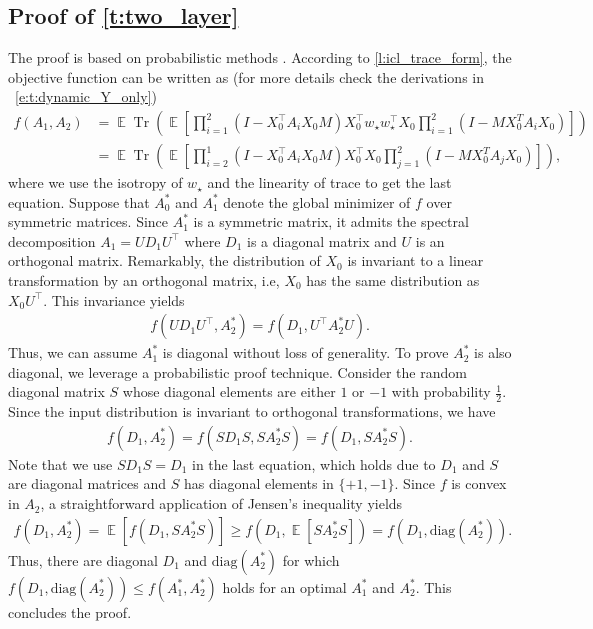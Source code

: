 \documentclass{article}
\DeclareMathOperator{\E}{\mathbb{E}}
\newcommand{\wstar}{w_\star}
\DeclareMathOperator{\tr}{Tr}
\newcommand{\diag}{\mathrm{diag}}
\begin{document}
\subsection{Proof of \autoref{t:two_layer}}
The proof is based on probabilistic methods \citep{alon2016probabilistic}. 
According to \autoref{l:icl_trace_form}, the objective function can be written as (for more details check the derivations in ~\eqref{e:t:dynamic_Y_only}) 
\begin{align}
f(A_1,A_2) & = \E \tr\left( \E \left[\prod_{i=1}^2 (I -  X_0^\top A_i X_0 M) X_0^\top \wstar \wstar^\top X_0 \prod_{i=1}^2 (I - M X_0^T A_i X_0) \right]\right) \\ 
& = \E \tr\left( \E \left[\prod_{i=2}^1 (I -  X_0^\top A_i X_0 M) X_0^\top X_0 \prod_{j=1}^2 (I - M X_0^T A_j X_0) \right]\right), 
\end{align}
where we use the isotropy of $\wstar$ and the linearity of trace to get the last equation.
Suppose that $A_0^*$ and $A_1^*$ denote the global minimizer of $f$ over symmetric matrices. Since $A_1^*$ is a symmetric matrix, it admits the spectral  decomposition $A_1 = U D_1 U^\top$ where $D_1$ is a diagonal matrix and $U$ is an orthogonal matrix. Remarkably,  the distribution of $X_0$ is invariant to a linear transformation by an orthogonal matrix, i.e, $X_0$ has the same distribution as $X_0 U^\top$. This invariance yields 
\begin{align}
f(U D_1 U^\top, A_2^*) = f(D_1, U^\top A_2^* U).
\end{align}
Thus, we can assume $A_1^*$ is diagonal without loss of generality. To prove $A_2^*$ is also diagonal, we leverage a probabilistic proof technique. Consider the random diagonal matrix $S$ whose diagonal elements are either $1$ or $-1$ with probability $\frac{1}{2}$. Since the input distribution is invariant to orthogonal transformations, we have 
\begin{align}
f( D_1, A_2^*) = f(S D_1 S, S A_2^* S) = f(D_1, S A_2^* S).
\end{align}
Note that we use $S D_1 S = D_1$ in the last equation, which holds due to $D_1$ and $S$ are diagonal matrices and $S$ has diagonal elements in $\{+1, -1 \}$. Since $f$ is convex in $A_2$, a straightforward application of Jensen's inequality yields 
\begin{align}
f(D_1, A_2^*) = \E \left[ f(D_1, S A_2^* S) \right] \geq f(D_1, \E \left[ S A_2^* S \right]) = f(D_1, \diag(A_2^*)).
\end{align}
Thus, there are diagonal $D_1$ and $\diag(A_2^*)$ for which $f(D_1, \diag(A_2^*)) \leq f(A_1^*, A_2^*)$ holds for an optimal $A_1^*$ and $A_2^*$. This concludes the proof.
 
\end{document}
